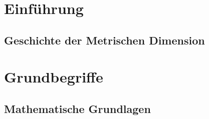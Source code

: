 


\listoftodos


\section{Einführung}
\subsection{Geschichte der Metrischen Dimension}
\pagebreak
\section{Grundbegriffe}

\subsection{Mathematische Grundlagen}

